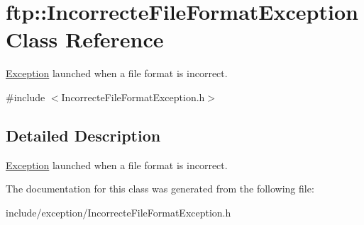 \hypertarget{classftp_1_1_incorrecte_file_format_exception}{\section{ftp\-:\-:Incorrecte\-File\-Format\-Exception Class Reference}
\label{classftp_1_1_incorrecte_file_format_exception}
}


\hyperlink{classftp_1_1_exception}{Exception} launched when a file format is incorrect.  




{\ttfamily \#include $<$Incorrecte\-File\-Format\-Exception.\-h$>$}



\subsection{Detailed Description}
\hyperlink{classftp_1_1_exception}{Exception} launched when a file format is incorrect. 

The documentation for this class was generated from the following file\-:\begin{DoxyCompactItemize}
\item 
include/exception/Incorrecte\-File\-Format\-Exception.\-h\end{DoxyCompactItemize}
